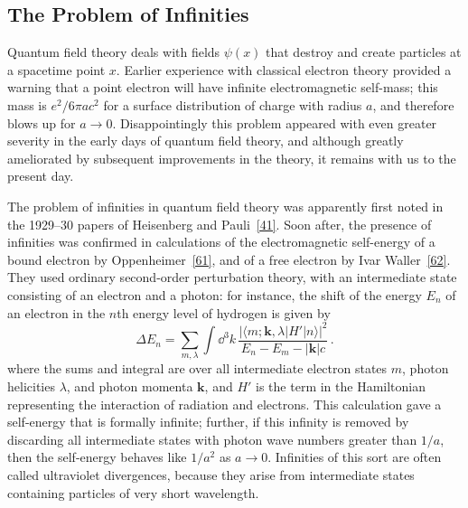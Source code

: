 
\subsection{The Problem of Infinities}

Quantum field theory deals with fields $\psi(x)$ that destroy and create particles at a spacetime point $x$. Earlier experience with classical electron theory provided a warning that a point electron will have infinite electromagnetic self-mass; this mass is $e^2/6\pi ac^2$ for a surface distribution of charge with radius $a$, and therefore blows up for $a\to0$. Disappointingly this problem appeared with even greater severity in the early days of quantum field theory, and although greatly ameliorated by subsequent improvements in the theory, it remains with us to the present day.

The problem of infinities in quantum field theory was apparently first noted in the 1929--30 papers of Heisenberg and Pauli~\hyperref[ref:1.41]{[41]}. Soon after, the presence of infinities was confirmed in calculations of the electromagnetic self-energy of a bound electron by Oppenheimer~\hyperref[ref:1.61]{[61]}, and of a free electron by Ivar Waller~\hyperref[ref:1.62]{[62]}. They used ordinary second-order perturbation theory, with an intermediate state consisting of an electron and a photon: for instance, the shift of the energy $E_n$ of an electron in the $n$th energy level of hydrogen is given by
\begin{equation}
  \Delta E_n=\sum_{m,\lambda}\int \dd^3k\,
  \frac{\left|\langle m;\mathbf{k},\lambda|H'|n\rangle\right|^2}
  {E_n-E_m-|\mathbf{k}|c}\,.
  \tag{1.3.1}\label{eq:1.3.1}
\end{equation}
where the sums and integral are over all intermediate electron states $m$, photon helicities $\lambda$, and photon momenta $\mathbf{k}$, and $H'$ is the term in the Hamiltonian representing the interaction of radiation and electrons. This calculation gave a self-energy that is formally infinite; further, if this infinity is removed by discarding all intermediate states with photon wave numbers greater than $1/a$, then the self-energy behaves like $1/a^2$ as $a\to0$. Infinities of this sort are often called ultraviolet divergences, because they arise from intermediate states containing particles of very short wavelength.

